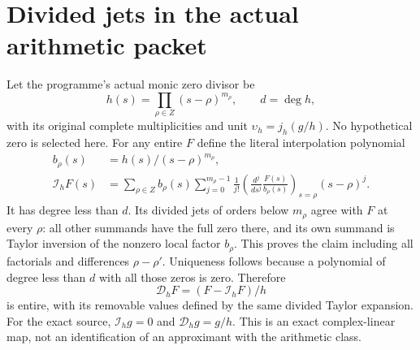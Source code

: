 \section{Divided jets in the actual arithmetic packet}
Let the programme's actual monic zero divisor be
\[
 h(s)=\prod_{\rho\in Z}(s-\rho)^{m_\rho},\qquad d=\deg h,
\]
with its original complete multiplicities and unit
$\upsilon_h=j_h(g/h)$. No hypothetical zero is selected here.
For any entire $F$ define the literal interpolation polynomial
\begin{equation}\tag{PT13}
 \begin{split}
 b_\rho(s)&=h(s)/(s-\rho)^{m_\rho},\\
 \mathcal I_hF(s)&=\sum_{\rho\in Z}b_\rho(s)
   \sum_{j=0}^{m_\rho-1}\frac{1}{j!}
     \left(\frac{d^j}{ds^j}\frac{F(s)}{b_\rho(s)}\right)_{s=\rho}
                      (s-\rho)^j.
 \end{split}
\end{equation}
It has degree less than $d$. Its divided jets of orders below
$m_\rho$ agree with $F$ at every $\rho$: all other summands
have the full zero there, and its own summand is Taylor inversion
of the nonzero local factor $b_\rho$. This proves the claim
including all factorials and differences $\rho-\rho'$.
Uniqueness follows because a polynomial of degree less than $d$
with all those zeros is zero. Therefore
\begin{equation}\tag{PT14}
 \mathcal D_hF=(F-\mathcal I_hF)/h
\end{equation}
is entire, with its removable values defined by the same divided
Taylor expansion. For the exact source, $\mathcal I_hg=0$
and $\mathcal D_hg=g/h$. This is an exact complex-linear map,
not an identification of an approximant with the arithmetic class.

